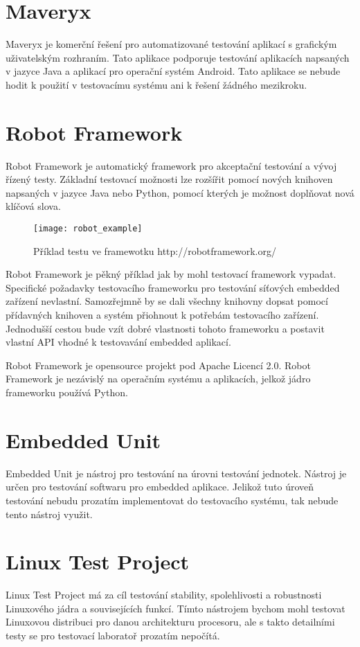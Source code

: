 \section{Maveryx}
Maveryx je komerční řešení pro automatizované testování aplikací s grafickým uživatelským rozhraním. Tato aplikace podporuje testování aplikacích napsaných v jazyce Java a aplikací pro operační systém Android. Tato aplikace se nebude hodit k použití v testovacímu systému ani k řešení žádného mezikroku.

\section{Robot Framework}
Robot Framework je automatický framework pro akceptační testování a vývoj řízený testy. Základní testovací možnosti lze rozšířit pomocí nových knihoven napsaných v jazyce Java nebo Python, pomocí kterých je možnost doplňovat nová klíčová slova.

\begin{figure}[h]
  \centering
  \texttt{[image: robot\_example]}
  \caption{Příklad testu ve framewotku http://robotframework.org/}
  \label{fig:robot_example}
\end{figure}

Robot Framework je pěkný příklad jak by mohl testovací framework vypadat. Specifické požadavky testovacího frameworku pro testování síťových embedded zařízení nevlastní. Samozřejmně by se dali všechny knihovny dopsat pomocí přídavných knihoven a systém přiohnout k potřebám testovacího zařízení. Jednodušší cestou bude vzít dobré vlastnosti tohoto frameworku a postavit vlastní API vhodné k testovavání embedded aplikací.

Robot Framework je opensource projekt pod Apache Licencí 2.0. Robot Framework je nezávislý na operačním systému a aplikacích, jelkož jádro frameworku používá Python.

\section{Embedded Unit}
Embedded Unit je nástroj pro testování na úrovni testování jednotek. Nástroj je určen pro testování softwaru pro embedded aplikace. Jelikož tuto úroveň testování nebudu prozatím implementovat do testovacího systému, tak nebude tento nástroj využit.

\section{Linux Test Project}
Linux Test Project má za cíl testování stability, spolehlivosti a robustnosti Linuxového jádra a souvisejících funkcí. Tímto nástrojem bychom mohl testovat Linuxovou distribuci pro danou architekturu procesoru, ale s takto detailními testy se pro testovací laboratoř prozatím nepočítá.

